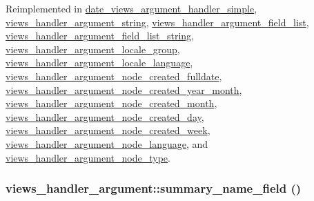 Reimplemented in \hyperlink{classdate__views__argument__handler__simple_a012035138d65e75b0f70af0e2024aa29}{date\_\-views\_\-argument\_\-handler\_\-simple}, \hyperlink{classviews__handler__argument__string_a8cc60c274ca743c78de23260edc3ee4a}{views\_\-handler\_\-argument\_\-string}, \hyperlink{classviews__handler__argument__field__list_acea7796e64251a82b2ad492b836ffbc8}{views\_\-handler\_\-argument\_\-field\_\-list}, \hyperlink{classviews__handler__argument__field__list__string_a02abc27f8dfd06bd5c6f9e24860afe9c}{views\_\-handler\_\-argument\_\-field\_\-list\_\-string}, \hyperlink{classviews__handler__argument__locale__group_aeffcc011f90a9269f7793e089b994f71}{views\_\-handler\_\-argument\_\-locale\_\-group}, \hyperlink{classviews__handler__argument__locale__language_a1677e5e59d9e98999bf5781d7de21b39}{views\_\-handler\_\-argument\_\-locale\_\-language}, \hyperlink{classviews__handler__argument__node__created__fulldate_ab3d201e95c5307b166a85add6cfdebe2}{views\_\-handler\_\-argument\_\-node\_\-created\_\-fulldate}, \hyperlink{classviews__handler__argument__node__created__year__month_a05689c48f520a9f0a1dc0008050eae03}{views\_\-handler\_\-argument\_\-node\_\-created\_\-year\_\-month}, \hyperlink{classviews__handler__argument__node__created__month_a1376f79ca0408659bea06caa51ce6da6}{views\_\-handler\_\-argument\_\-node\_\-created\_\-month}, \hyperlink{classviews__handler__argument__node__created__day_acd7fa6e862306ba955d314d464e1cf2d}{views\_\-handler\_\-argument\_\-node\_\-created\_\-day}, \hyperlink{classviews__handler__argument__node__created__week_a12d7be7da978ed5571bb28a17b6b2805}{views\_\-handler\_\-argument\_\-node\_\-created\_\-week}, \hyperlink{classviews__handler__argument__node__language_aa07770dbbc40710c5369f76f4d4b6a35}{views\_\-handler\_\-argument\_\-node\_\-language}, and \hyperlink{classviews__handler__argument__node__type_ae4200f641b598c219f733f10386f7d90}{views\_\-handler\_\-argument\_\-node\_\-type}.\hypertarget{classviews__handler__argument_a6432caaadc9ed6e918ae8018bbb03ae2}{
\subsubsection[{summary\_\-name\_\-field}]{\setlength{\rightskip}{0pt plus 5cm}views\_\-handler\_\-argument::summary\_\-name\_\-field ()}}
\label{classviews__handler__argument_a6432caaadc9ed6e918ae8018bbb03ae2}
